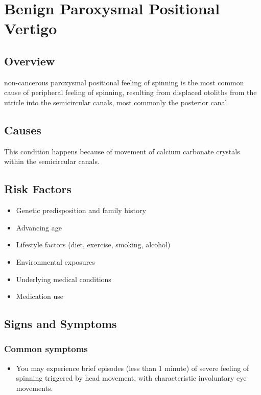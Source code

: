 \chapter{Benign Paroxysmal Positional Vertigo}
\label{sec:Benign Paroxysmal Positional Vertigo}

\section{Overview}
non-cancerous paroxysmal positional feeling of spinning is the most common cause of peripheral feeling of spinning, resulting from displaced otoliths from the utricle into the semicircular canals, most commonly the posterior canal.
\section{Causes}
This condition happens because of movement of calcium carbonate crystals within the semicircular canals.     
\section{Risk Factors}

\begin{itemize}[noitemsep]
  \item Genetic predisposition and family history
  \item Advancing age
  \item Lifestyle factors (diet, exercise, smoking, alcohol)
  \item Environmental exposures
  \item Underlying medical conditions
  \item Medication use
\end{itemize}
\section{Signs and Symptoms}

\subsection{Common symptoms}
\begin{itemize}[noitemsep]
  \item You may experience brief episodes (less than 1 minute) of severe feeling of spinning triggered by head movement, with characteristic involuntary eye movements. 
  \end{itemize}

